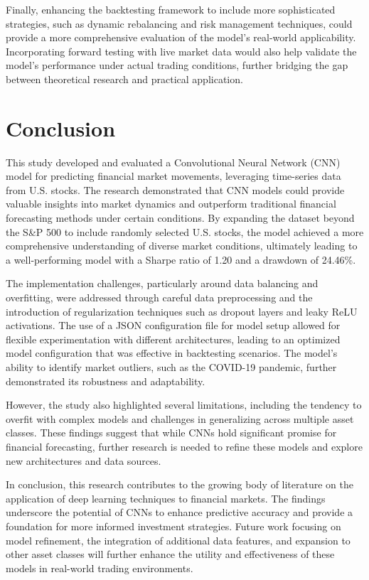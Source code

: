 Finally, enhancing the backtesting framework to include more sophisticated strategies, such as dynamic rebalancing and risk management techniques, could provide a more comprehensive evaluation of the model's real-world applicability. Incorporating forward testing with live market data would also help validate the model's performance under actual trading conditions, further bridging the gap between theoretical research and practical application.

\section{Conclusion}

This study developed and evaluated a Convolutional Neural Network (CNN) model for predicting financial market movements, leveraging time-series data from U.S. stocks. The research demonstrated that CNN models could provide valuable insights into market dynamics and outperform traditional financial forecasting methods under certain conditions. By expanding the dataset beyond the S\&P 500 to include randomly selected U.S. stocks, the model achieved a more comprehensive understanding of diverse market conditions, ultimately leading to a well-performing model with a Sharpe ratio of 1.20 and a drawdown of 24.46\%.

The implementation challenges, particularly around data balancing and overfitting, were addressed through careful data preprocessing and the introduction of regularization techniques such as dropout layers and leaky ReLU activations. The use of a JSON configuration file for model setup allowed for flexible experimentation with different architectures, leading to an optimized model configuration that was effective in backtesting scenarios. The model's ability to identify market outliers, such as the COVID-19 pandemic, further demonstrated its robustness and adaptability.

However, the study also highlighted several limitations, including the tendency to overfit with complex models and challenges in generalizing across multiple asset classes. These findings suggest that while CNNs hold significant promise for financial forecasting, further research is needed to refine these models and explore new architectures and data sources.

In conclusion, this research contributes to the growing body of literature on the application of deep learning techniques to financial markets. The findings underscore the potential of CNNs to enhance predictive accuracy and provide a foundation for more informed investment strategies. Future work focusing on model refinement, the integration of additional data features, and expansion to other asset classes will further enhance the utility and effectiveness of these models in real-world trading environments.
